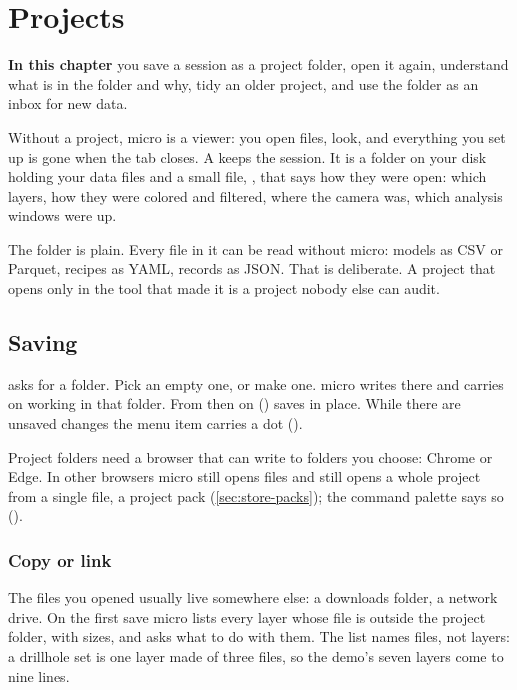 \chapter{Projects}\label{ch:projects}
\begin{goals}
\textbf{In this chapter} you save a session as a project folder, open it again, understand what is in the folder and why, tidy an older project, and use the folder as an inbox for new data.
\end{goals}

Without a project, micro is a viewer: you open files, look, and everything you set up is gone when the tab closes. A  keeps the session. It is a folder on your disk holding your data files and a small file, , that says how they were open: which layers, how they were colored and filtered, where the camera was, which analysis windows were up.

The folder is plain. Every file in it can be read without micro: models as CSV or Parquet, recipes as YAML, records as JSON. That is deliberate. A project that opens only in the tool that made it is a project nobody else can audit.

\section{Saving}\label{sec:projects-save}
 asks for a folder. Pick an empty one, or make one. micro writes  there and carries on working in that folder. From then on  () saves in place. While there are unsaved changes the menu item carries a dot ().

\begin{note}
Project folders need a browser that can write to folders you choose: Chrome or Edge. In other browsers micro still opens files and still opens a whole project from a single file, a project pack (\cref{sec:store-packs}); the command palette says so ().
\end{note}

\subsection{Copy or link}\label{sec:projects-copy}
The files you opened usually live somewhere else: a downloads folder, a network drive. On the first save micro lists every layer whose file is outside the project folder, with sizes, and asks what to do with them. The list names files, not layers: a drillhole set is one layer made of three files, so the demo's seven layers come to nine lines.

